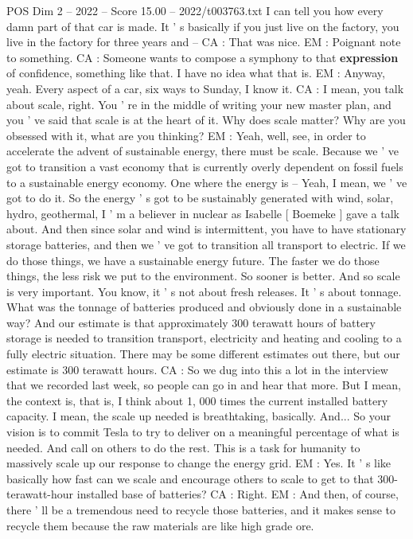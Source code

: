 \begin{textsample}{POS Dim 2 – 2022 – Score 15.00 – 2022/t003763.txt}
I can tell you how every damn part of that car is made.
It ' s basically if you just live on the factory, you live in the factory for three years and -- CA : That was nice.
EM : Poignant note to something.
CA : Someone wants to compose a symphony to that \textbf{expression} of confidence, something like that.
I have no idea what that is.
EM : Anyway, yeah.
Every aspect of a car, six ways to Sunday, I know it.
CA : I mean, you talk about scale, right.
You ' re in the middle of writing your new master plan, and you ' ve said that scale is at the heart of it.
Why does scale matter?
Why are you obsessed with it, what are you thinking?
EM : Yeah, well, see, in order to accelerate the advent of sustainable energy, there must be scale.
Because we ' ve got to transition a vast economy that is currently overly dependent on fossil fuels to a sustainable energy economy.
One where the energy is -- Yeah, I mean, we ' ve got to do it.
So the energy ' s got to be sustainably generated with wind, solar, hydro, geothermal, I ' m a believer in nuclear as Isabelle [ Boemeke ] gave a talk about.
And then since solar and wind is intermittent, you have to have stationary storage batteries, and then we ' ve got to transition all transport to electric.
If we do those things, we have a sustainable energy future.
The faster we do those things, the less risk we put to the environment.
So sooner is better.
And so scale is very important.
You know, it ' s not about fresh releases.
It ' s about tonnage.
What was the tonnage of batteries produced and obviously done in a sustainable way?
And our estimate is that approximately 300 terawatt hours of battery storage is needed to transition transport, electricity and heating and cooling to a fully electric situation.
There may be some different estimates out there, but our estimate is 300 terawatt hours.
CA : So we dug into this a lot in the interview that we recorded last week, so people can go in and hear that more.
But I mean, the context is, that is, I think about 1, 000 times the current installed battery capacity.
I mean, the scale up needed is breathtaking, basically.
And...
So your vision is to commit Tesla to try to deliver on a meaningful percentage of what is needed.
And call on others to do the rest.
This is a task for humanity to massively scale up our response to change the energy grid.
EM : Yes.
It ' s like basically how fast can we scale and encourage others to scale to get to that 300-terawatt-hour installed base of batteries?
CA : Right.
EM : And then, of course, there ' ll be a tremendous need to recycle those batteries, and it makes sense to recycle them because the raw materials are like high grade ore.

\end{textsample}
